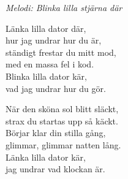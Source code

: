 {\footnotesize\textit{Melodi: Blinka lilla stjärna där}}\par
\vspace{10pt}
Länka lilla dator där,\\
hur jag undrar hur du är,\\
ständigt frestar du mitt mod,\\
med en massa fel i kod.\\
Blinka lilla dator kär,\\
vad jag undrar hur du gör.\par
\vspace{10pt}
När den sköna sol blitt släckt,\\
strax du startas upp så käckt.\\
Börjar klar din stilla gång,\\
glimmar, glimmar natten lång.\\
Länka lilla dator kär,\\
jag undrar vad klockan är.
